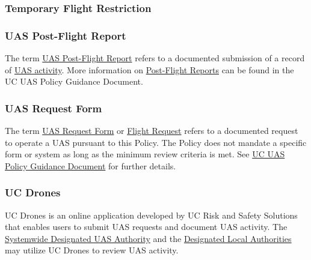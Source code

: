 \documentclass[
]{book}
\begin{document}
\hypertarget{TFR}{%
\subsubsection*{Temporary Flight Restriction}\label{TFR}}







\hypertarget{postflight}{%
\subsubsection*{UAS Post-Flight Report}\label{postflight}}

The term \protect\hyperlink{postflight}{UAS Post-Flight Report} refers to a documented submission of a record of \protect\hyperlink{UASactivity}{UAS activity}. More information on \protect\hyperlink{postflight}{Post-Flight Reports} can be found in the UC UAS Policy Guidance Document.







\hypertarget{FR}{%
\subsubsection*{UAS Request Form}\label{FR}}

The term \protect\hyperlink{FR}{UAS Request Form} or \protect\hyperlink{FR}{Flight Request} refers to a documented request to operate a UAS pursuant to this Policy. The Policy does not mandate a specific form or system as long as the minimum review criteria is met. See \protect\hyperlink{UASPGD}{UC UAS Policy Guidance Document} for further details.





\hypertarget{UCDrones}{%
\subsubsection*{UC Drones}\label{UCDrones}}

UC Drones is an online application developed by UC Risk and Safety Solutions that enables users to submit UAS requests and document UAS activity. The \protect\hyperlink{SDA}{Systemwide Designated UAS Authority} and the \protect\hyperlink{DLA}{Designated Local Authorities} may utilize UC Drones to review UAS activity.
\end{document}
